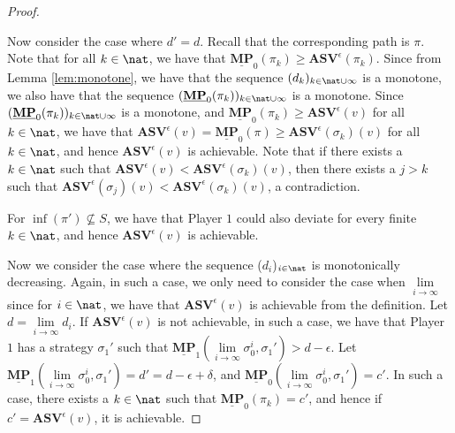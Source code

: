 \begin{proof}
\begin{enumerate}
Now consider the case where $d' = d$.
Recall that the corresponding path is $\pi$.
Note that for all $k \in \nat$, we have that $\underline{\mathbf{MP}}_0(\pi_k) \ge \mathbf{ASV}^{\epsilon}(\pi_k)$.
Since from Lemma \ref{lem:monotone}, we have that the sequence $(d_k)_{k \in \nat \cup {\infty}}$ is a monotone, we also have that the sequence $(\underline{\mathbf{MP}}_0(\pi_k))_{k \in \nat \cup {\infty}}$ is a monotone.
Since $(\underline{\mathbf{MP}}_0(\pi_k))_{k \in \nat \cup {\infty}}$ is a monotone, and $\underline{\mathbf{MP}}_0(\pi_k) \ge \mathbf{ASV}^{\epsilon}(v)$ for all $k \in \nat$, we have that $\mathbf{ASV}^{\epsilon}(v)=\underline{\mathbf{MP}}_0(\pi) \ge \mathbf{ASV}^{\epsilon}(\sigma_k)(v)$ for all $k \in \nat$, and hence $\mathbf{ASV}^{\epsilon}(v)$ is achievable.
Note that if there exists a $k \in \nat$ such that $\mathbf{ASV}^{\epsilon}(v) < \mathbf{ASV}^{\epsilon}(\sigma_k)(v)$, then there exists a $j > k$ such that $\mathbf{ASV}^{\epsilon}(\sigma_j)(v) < \mathbf{ASV}^{\epsilon}(\sigma_k)(v)$, a contradiction.

For $\inf(\pi') \not \subseteq S$, we have that Player $1$ could also deviate for every finite $k \in \nat$, and hence $\mathbf{ASV}^{\epsilon}(v)$ is achievable.

\end{enumerate}
Now we consider the case where the sequence ($d_i$)$_{i \in \nat}$ is monotonically decreasing.
Again, in such a case, we only need to consider the case when $\lim \limits_{i \rightarrow \infty}$ since for $i \in \nat$, we have that $\mathbf{ASV}^{\epsilon}(v)$ is achievable from the definition.
Let $d = \lim \limits_{i \rightarrow \infty} d_i$.
If $\mathbf{ASV}^{\epsilon}(v)$ is not achievable, in such a case, we have that Player $1$ has a strategy $\sigma_1'$ such that $\underline{\mathbf{MP}}_1(\lim \limits_{i \rightarrow \infty} \sigma_0^i, \sigma_1') > d-\epsilon$.
Let $\underline{\mathbf{MP}}_1(\lim \limits_{i \rightarrow \infty} \sigma_0^i, \sigma_1') = d' =  d-\epsilon+\delta$, and $\underline{\mathbf{MP}}_0(\lim \limits_{i \rightarrow \infty} \sigma_0^i, \sigma_1') = c'$.
In such a case, there exists a $k \in \nat$ such that $\underline{\mathbf{MP}}_0(\pi_k)=c'$, and hence if $c'=\mathbf{ASV}^{\epsilon}(v)$, it is achievable.
\end{proof}